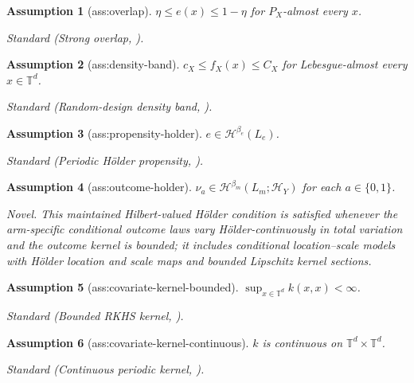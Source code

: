 \documentclass{article}
\newtheorem{assumption}{Assumption}
\begin{document}
\begin{assumption}[ass:overlap]\label{ass:overlap}
\(\eta\le e(x)\le1-\eta\) for \(P_X\)-almost every \(x\).
\par\smallskip\noindent\emph{Standard} (Strong overlap, \cite{JainLuedtke2026SCoDiTE}).
\end{assumption}

\begin{assumption}[ass:density-band]\label{ass:density-band}
\(c_X\le f_X(x)\le C_X\) for Lebesgue-almost every \(x\in\mathbb T^d\).
\par\smallskip\noindent\emph{Standard} (Random-design density band, \cite{KennedyBalakrishnanRobinsWasserman2024CATE}).
\end{assumption}

\begin{assumption}[ass:propensity-holder]\label{ass:propensity-holder}
\(e\in\mathcal H^{\beta_e}(L_e)\).
\par\smallskip\noindent\emph{Standard} (Periodic Hölder propensity, \cite{KennedyBalakrishnanRobinsWasserman2024CATE}).
\end{assumption}

\begin{assumption}[ass:outcome-holder]\label{ass:outcome-holder}
\(\nu_a\in\mathcal H^{\beta_m}(L_m;\mathcal H_Y)\) for each \(a\in\{0,1\}\).
\par\smallskip\noindent\emph{Novel.} This maintained Hilbert-valued Hölder condition is satisfied whenever the arm-specific conditional outcome laws vary Hölder-continuously in total variation and the outcome kernel is bounded; it includes conditional location--scale models with Hölder location and scale maps and bounded Lipschitz kernel sections.
\end{assumption}

\begin{assumption}[ass:covariate-kernel-bounded]\label{ass:covariate-kernel-bounded}
\(\sup_{x\in\mathbb T^d}k(x,x)<\infty\).
\par\smallskip\noindent\emph{Standard} (Bounded RKHS kernel, \cite{HagrassSriperumbudurLi2024SR2T}).
\end{assumption}

\begin{assumption}[ass:covariate-kernel-continuous]\label{ass:covariate-kernel-continuous}
\(k\) is continuous on \(\mathbb T^d\times\mathbb T^d\).
\par\smallskip\noindent\emph{Standard} (Continuous periodic kernel, \cite{HagrassSriperumbudurLi2024SR2T}).
\end{assumption}
\end{document}
